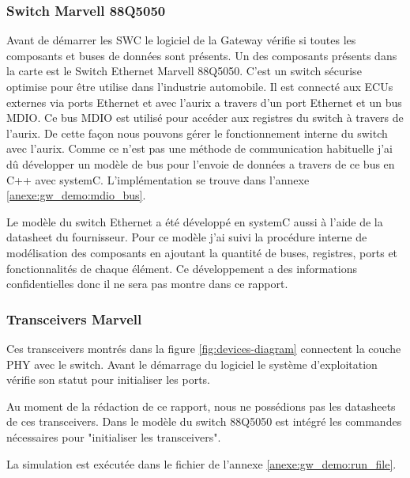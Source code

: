   

\subsubsection{Switch Marvell 88Q5050} 

  

Avant de démarrer les SWC le logiciel de la Gateway vérifie si toutes les composants et buses de données sont présents. Un des composants présents dans la carte est le Switch Ethernet Marvell 88Q5050\cite{sw88Q5050}. C'est un switch sécurise optimise pour être utilise dans l'industrie automobile. Il est connecté aux ECUs externes via ports Ethernet et avec l'aurix a travers d'un port Ethernet et un bus MDIO\cite{mdio-background}. Ce bus MDIO est utilisé pour accéder aux registres du switch à travers de l'aurix. De cette façon nous pouvons gérer le fonctionnement interne du switch avec l'aurix. Comme ce n'est pas une méthode de communication habituelle j'ai dû développer un modèle de bus pour l'envoie de données a travers de ce bus en C++ avec systemC. L'implémentation se trouve dans l'annexe \ref{anexe:gw_demo:mdio_bus}. 

  

Le modèle du switch Ethernet a été développé en systemC aussi à l'aide de la datasheet du fournisseur. Pour ce modèle j'ai suivi la procédure interne de modélisation des composants en ajoutant la quantité de buses, registres, ports et fonctionnalités de chaque élément. Ce développement a des informations confidentielles donc il ne sera pas montre dans ce rapport. 

  

\subsubsection{Transceivers Marvell} 

  

Ces transceivers montr\'es dans la figure \ref{fig:devices-diagram}\cite{88Q2112}\cite{88Q1010} connectent la couche PHY avec le switch. Avant le démarrage du logiciel le système d'exploitation vérifie son statut pour initialiser les ports. 

  

Au moment de la rédaction de ce rapport, nous ne possédions pas les datasheets de ces transceivers. Dans le modèle du switch 88Q5050 est intégré les commandes nécessaires pour "initialiser les transceivers". 

  

La simulation est exécutée dans le fichier de l'annexe \ref{anexe:gw_demo:run_file}. 